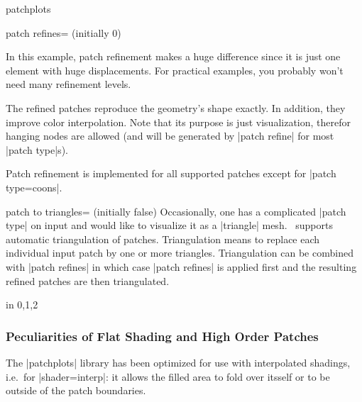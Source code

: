 \begin{pgfplotslibrary}{patchplots}
\begin{pgfplotskey}{patch refines= (initially 0)}
\begin{codeexample}[]
{
}
\end{codeexample}
	\noindent In this example, patch refinement makes a huge difference since it is just one element with huge displacements. For practical examples, you probably won't need many refinement levels.
	
	The refined patches reproduce the geometry's shape exactly. In addition, they improve color interpolation. Note that its purpose is just visualization, therefor hanging nodes are allowed (and will be generated by |patch refine| for most |patch type|s).

	Patch refinement is implemented for all supported patches except for |patch type=coons|.
\end{pgfplotskey}

\begin{pgfplotskey}{patch to triangles= (initially false)}
	Occasionally, one has a complicated |patch type| on input and would like to visualize it as a |triangle| mesh. \PGFPlots\ supports automatic triangulation of patches. Triangulation means to replace each individual input patch by one or more triangles. Triangulation can be combined with |patch refines| in which case |patch refines| is applied first and the resulting refined patches are then triangulated.
\begin{codeexample}[]
\foreach \level in {0,1,2} {%
}
\end{codeexample}
\end{pgfplotskey}

\subsubsection{Peculiarities of Flat Shading and High Order Patches}
\label{sec:lib:patchplots:flat}
The |patchplots| library has been optimized for use with interpolated shadings, i.e.\ for |shader=interp|: it allows the filled area to fold over itsself or to be outside of the patch boundaries.


\end{pgfplotslibrary}
